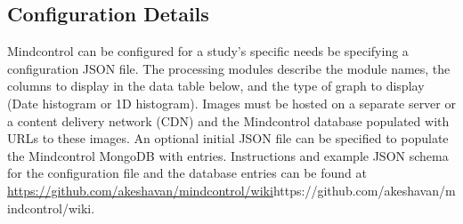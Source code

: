 \subsection{Configuration Details}

Mindcontrol can be configured for a study's specific needs be specifying a configuration JSON file. The processing modules describe the module names, the columns to display in the data table below, and the type of graph to display (Date histogram or 1D histogram). Images must be hosted on a separate server or a content delivery network (CDN) and the Mindcontrol database populated with URLs to these images. An optional initial JSON file can be specified to populate the Mindcontrol MongoDB with entries. Instructions and example JSON schema for the configuration file and the database entries can be found at \url{https://github.com/akeshavan/mindcontrol/wiki}{https://github.com/akeshavan/mindcontrol/wiki}. 

